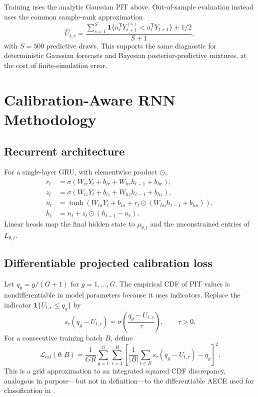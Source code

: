 \documentclass[11pt]{article}
\newcommand{\ind}{\mathbf{1}}
\begin{document}
Training uses the analytic Gaussian PIT above. Out-of-sample evaluation instead
uses the common sample-rank approximation
\[
 \widehat U_{t,r}=\frac{\sum_{s=1}^{S}
 \ind\{a_r^{\mathsf T}Y_{t+1}^{(s)}<a_r^{\mathsf T}Y_{t+1}\}+1/2}{S+1},
\]
with $S=500$ predictive draws. This supports the same diagnostic for deterministic
Gaussian forecasts and Bayesian posterior-predictive mixtures, at the cost of
finite-simulation error.

\section{Calibration-Aware RNN Methodology}

\subsection{Recurrent architecture}

For a single-layer GRU, with elementwise product $\odot$,
\begin{align*}
r_t&=\sigma(W_{ir}Y_t+b_{ir}+W_{hr}h_{t-1}+b_{hr}),\\
z_t&=\sigma(W_{iz}Y_t+b_{iz}+W_{hz}h_{t-1}+b_{hz}),\\
n_t&=\tanh(W_{in}Y_t+b_{in}+r_t\odot(W_{hn}h_{t-1}+b_{hn})),\\
h_t&=n_t+z_t\odot(h_{t-1}-n_t).
\end{align*}
Linear heads map the final hidden state to $\mu_{\theta,t}$ and the unconstrained
entries of $L_{\theta,t}$.

\subsection{Differentiable projected calibration loss}

Let $q_g=g/(G+1)$ for $g=1,\ldots,G$. The empirical CDF of PIT values is
nondifferentiable in model parameters because it uses indicators. Replace the
indicator $\ind\{U_{t,r}\leq q_g\}$ by
\[
s_\tau(q_g-U_{t,r})
=\sigma\!\left(\frac{q_g-U_{t,r}}{\tau}\right),\qquad \tau>0.
\]
For a consecutive training batch $B$, define
\begin{equation}
\mathcal L_{\mathrm{cal}}(\theta;B)
=\frac{1}{GR}\sum_{g=1}^G\sum_{r=1}^R
\left[
\frac{1}{|B|}\sum_{t\in B}s_\tau(q_g-U_{t,r})-q_g
\right]^2.
\label{eq:cal-loss}
\end{equation}
This is a grid approximation to an integrated squared CDF discrepancy, analogous
in purpose---but not in definition---to the differentiable AECE used for
classification in \cite{huang2024cabl}.
\end{document}
